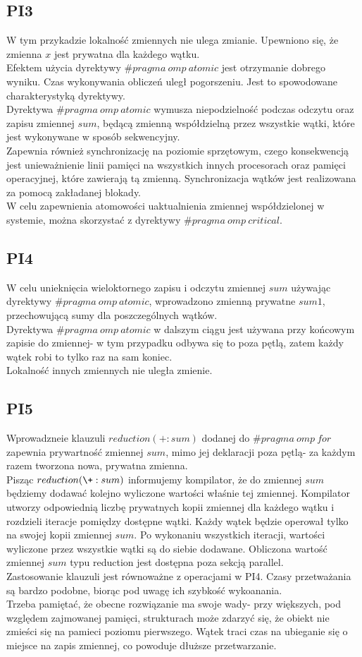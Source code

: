 \documentclass{article}
\begin{document}
\subsection{PI3}
W tym przykadzie lokalność zmiennych nie ulega zmianie. Upewniono się, że zmienna $x$ jest prywatna dla każdego wątku.\\
Efektem użycia dyrektywy $\#pragma\:omp\:atomic$ jest otrzymanie dobrego wyniku. Czas wykonywania obliczeń uległ pogorszeniu. Jest to spowodowane charakterystyką dyrektywy.\\
Dyrektywa $\#pragma\:omp\:atomic$ wymusza niepodzielność podczas odczytu oraz zapisu zmiennej $sum$, będącą zmienną współdzielną przez wszystkie wątki, które jest wykonywane w sposób sekwencyjny. \\
Zapewnia również synchronizację na poziomie sprzętowym, czego konsekwencją jest unieważnienie linii pamięci na wszystkich innych procesorach oraz pamięci operacyjnej, które zawierają tą zmienną. Synchronizacja wątków jest realizowana za pomocą zakładanej blokady.\\
W celu zapewnienia atomowości uaktualnienia zmiennej współdzielonej w systemie, można skorzystać z dyrektywy $\#pragma\:omp\:critical$.
\subsection{PI4}
W celu unieknięcia wieloktornego zapisu i odczytu zmiennej $sum$ używając dyrektywy $\#pragma\:omp\:atomic$, wprowadzono zmienną prywatne $sum1$, przechowującą sumy dla poszczególnych wątków. \\
Dyrektywa $\#pragma\:omp\:atomic$ w dalszym ciągu jest używana przy końcowym zapisie do zmiennej- w tym przypadku odbywa się to poza pętlą, zatem każdy wątek robi to tylko raz na sam koniec.\\
Lokalność innych zmiennych nie uległa zmienie.
\subsection{PI5}
Wprowadzneie klauzuli $reduction(+:sum)$ dodanej do $\#pragma\:omp\:for$ zapewnia prywartność zmiennej $sum$, mimo jej deklaracji poza pętlą- za każdym razem tworzona nowa, prywatna zmienna.\\
Pisząc $reduction(\+:sum)$ informujemy kompilator, że do zmiennej $sum$ będziemy dodawać kolejno wyliczone wartości właśnie tej zmiennej. Kompilator utworzy odpowiednią liczbę prywatnych kopii zmiennej dla każdego wątku i rozdzieli iteracje pomiędzy dostępne wątki. Każdy wątek będzie operował tylko na swojej kopii zmiennej $sum$. Po wykonaniu wszystkich iteracji, wartości wyliczone przez wszystkie wątki są do siebie dodawane. Obliczona wartość zmiennej $sum$ typu reduction jest dostępna poza sekcją parallel.\\
Zastosowanie klauzuli jest równoważne z operacjami w PI4. Czasy przetważania są bardzo podobne, biorąc pod uwagę ich szybkość wykoanania.\\
Trzeba pamiętać, że obecne rozwiązanie ma swoje wady- przy większych, pod względem zajmowanej pamięci, strukturach może zdarzyć się, że obiekt nie zmieści się na pamieci poziomu pierwszego. Wątek traci czas na ubieganie się o miejsce na zapis zmiennej, co powoduje dłuższe przetwarzanie. 
\end{document}
